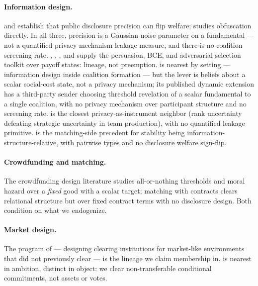 \documentclass[11pt]{article}
\theoremstyle{definition}
\theoremstyle{remark}
\begin{document}
\paragraph{Information design.}
\citet{morris2002social} and \citet{cornand2008publicity} establish that public disclosure
precision can flip welfare; \citet{li2023global} studies obfuscation directly. In all
three, precision is a Gaussian noise parameter on a fundamental --- not a quantified
privacy-mechanism leakage measure, and there is no coalition screening rate.
\citet{kamenica2011bayesian}, \citet{bergemann2019information},
\citet{morris2024implementation}, and \citet{inostroza2025adversarial} supply the
persuasion, BCE, and adversarial-selection toolkit over payoff states: lineage, not
preemption. \citet{vosooghi2017information} is nearest by setting --- information design
inside coalition formation --- but the lever is beliefs about a scalar social-cost state,
not a privacy mechanism; its published dynamic extension
\citep{vosooghi2022information} has a third-party sender choosing threshold revelation of
a scalar fundamental to a single coalition, with no privacy mechanism over participant
structure and no screening rate. \citet{halac2021rank} is the closest
privacy-as-instrument neighbor (rank uncertainty defeating strategic uncertainty in team
production), with no quantified leakage primitive. \citet{chen2023stability} is the
matching-side precedent for stability being information-structure-relative, with pairwise
types and no disclosure welfare sign-flip.

\paragraph{Crowdfunding and matching.} The crowdfunding design literature
\citep{strausz2017crowdfunding,ellman2019optimal,belleflamme2014crowdfunding} studies
all-or-nothing thresholds and moral hazard over a \emph{fixed} good with a scalar target;
matching with contracts \citep{hatfield2005matching} clears relational structure but over
fixed contract terms with no disclosure design. Both condition on what we endogenize.

\paragraph{Market design.}
The program of \citet{roth1999redesign,roth2002engineer} --- designing clearing
institutions for market-like environments that did not previously clear --- is the lineage
we claim membership in. \citet{weyl2018radical} is nearest in ambition, distinct in
object: we clear non-transferable conditional commitments, not assets or votes.
\end{document}

